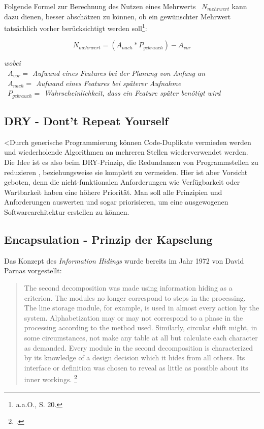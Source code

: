 Folgende Formel zur Berechnung des Nutzen eines Mehrwerts ~$N_{mehrwert}$ kann dazu dienen, besser abschätzen zu können, ob ein gewünschter Mehrwert tatsächlich vorher berücksichtigt werden soll\footnote{a.a.O., S. 20.}:
\\
\linebreak

\begin{dmath}
N_{mehrwert} = (A_{nach} * P_{gebrauch}) - A_{vor}
\end{dmath}

\par
\begingroup
\leftskip=2cm
\rightskip=2cm
\noindent \textit{wobei \\~$A_{vor} =$ Aufwand eines Features bei der Planung von Anfang an\\~$A_{nach} =$ Aufwand eines Features bei späterer Aufnahme\\~$P_{gebrauch} =$ Wahrscheinlichkeit, dass ein Feature später benötigt wird}
\par
\endgroup
\endgroup

\subsection*{DRY - Dont't Repeat Yourself}

<Durch generische Programmierung können Code-Duplikate vermieden werden und wiederholende Algorithmen an mehreren Stellen wiederverwendet werden. Die Idee ist es also beim DRY-Prinzip, die Redundanzen von Programmstellen zu reduzieren , beziehungsweise sie komplett zu vermeiden. Hier ist aber Vorsicht geboten, denn die nicht-funktionalen Anforderungen wie Verfügbarkeit oder Wartbarkeit haben eine höhere Priorität. Man soll alle Prinzipien und Anforderungen auswerten und sogar priorisieren, um eine ausgewogenen Softwarearchitektur erstellen zu können\autocite[Vgl.][21]{gmodse}.

\subsection*{Encapsulation - Prinzip der Kapselung}
Das Konzept des \textit{Information Hidings} wurde bereits im Jahr 1972 von David Parnas vorgestellt:

\begin{quote}
\glqq{}The second decomposition was made using \grqq{}information hiding\grqq{} as a criterion. The modules no
longer correspond to steps in the processing. The line
storage module, for example, is used in almost every
action by the system. Alphabetization may or may not
correspond to a phase in the processing according to
the method used. Similarly, circular shift might, in some
circumstances, not make any table at all but calculate
each character as demanded. Every module in the
second decomposition is characterized by its knowledge
of a design decision which it hides from all others. Its
interface or definition was chosen to reveal as little as
possible about its inner workings.\grqq{} \footcite[][1056]{parmas}
\end{quote}

